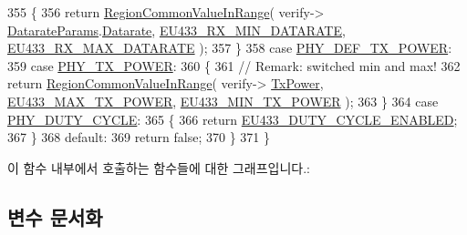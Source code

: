 \begin{DoxyCode}
355         \{
356             \textcolor{keywordflow}{return} \mbox{\hyperlink{group___r_e_g_i_o_n_c_o_m_m_o_n_gafdd1c80d953e18d755a631b72a9c3bd3}{RegionCommonValueInRange}}( verify->
      \mbox{\hyperlink{unionu_verify_params_a92427be16343eb3d9c14334eb95ec058}{DatarateParams}}.\mbox{\hyperlink{structu_verify_params_1_1s_datarate_params_ae2f6080f3aa0e9485c55513ca56bb24d}{Datarate}}, \mbox{\hyperlink{group___r_e_g_i_o_n_e_u433_ga895971124c9b602ce25f611d37df78a3}{EU433\_RX\_MIN\_DATARATE}}, 
      \mbox{\hyperlink{group___r_e_g_i_o_n_e_u433_ga565b799e9b0922806ddf14fa8518a51b}{EU433\_RX\_MAX\_DATARATE}} );
357         \}
358         \textcolor{keywordflow}{case} \mbox{\hyperlink{group___r_e_g_i_o_n_gga51cbe8f5433d914fe9cf81b451de2c2da18ae0d314f20c212f9e40207099ab1bb}{PHY\_DEF\_TX\_POWER}}:
359         \textcolor{keywordflow}{case} \mbox{\hyperlink{group___r_e_g_i_o_n_gga51cbe8f5433d914fe9cf81b451de2c2da0dceb30b79f1bae301afd5406a86d6f3}{PHY\_TX\_POWER}}:
360         \{
361             \textcolor{comment}{// Remark: switched min and max!}
362             \textcolor{keywordflow}{return} \mbox{\hyperlink{group___r_e_g_i_o_n_c_o_m_m_o_n_gafdd1c80d953e18d755a631b72a9c3bd3}{RegionCommonValueInRange}}( verify->
      \mbox{\hyperlink{unionu_verify_params_a037b4f849fa8ed4aa1d3c58aef2b28ec}{TxPower}}, \mbox{\hyperlink{group___r_e_g_i_o_n_e_u433_gaac93ce9446f1e4b5c3c09c9b2ebf2297}{EU433\_MAX\_TX\_POWER}}, \mbox{\hyperlink{group___r_e_g_i_o_n_e_u433_gadb49eb1bda0c5ae6b68eb817bf4d4810}{EU433\_MIN\_TX\_POWER}} );
363         \}
364         \textcolor{keywordflow}{case} \mbox{\hyperlink{group___r_e_g_i_o_n_gga51cbe8f5433d914fe9cf81b451de2c2dac66308571e624ecc28c79ee0deab8cf0}{PHY\_DUTY\_CYCLE}}:
365         \{
366             \textcolor{keywordflow}{return} \mbox{\hyperlink{group___r_e_g_i_o_n_e_u433_gace175cf02edd563e039993cdfd8464cf}{EU433\_DUTY\_CYCLE\_ENABLED}};
367         \}
368         \textcolor{keywordflow}{default}:
369             \textcolor{keywordflow}{return} \textcolor{keyword}{false};
370     \}
371 \}
\end{DoxyCode}
이 함수 내부에서 호출하는 함수들에 대한 그래프입니다.\+:


\subsection{변수 문서화}
\mbox{\label{group___r_e_g_i_o_n_e_u433_ga84be709d4ff8c252ddc14460d3a54380}} 
